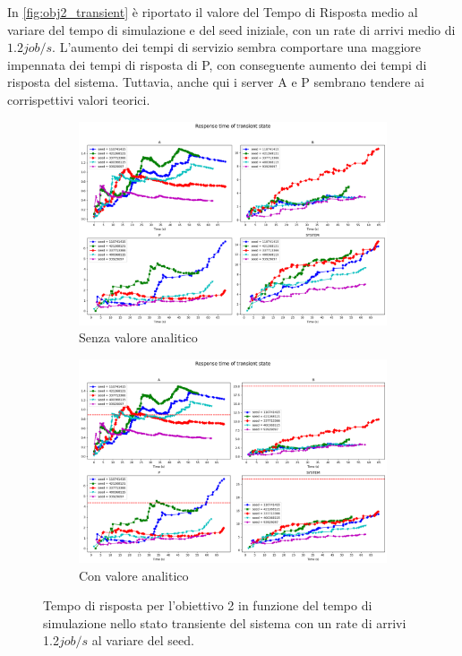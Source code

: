In \autoref{fig:obj2_transient} è riportato il valore del Tempo di Risposta medio al variare del tempo di simulazione e del seed iniziale, con un rate di arrivi medio di $1.2 job/s$. L'aumento dei tempi di servizio sembra comportare una maggiore impennata dei tempi di risposta di P, con conseguente aumento dei tempi di risposta del sistema. Tuttavia, anche qui i server A e P sembrano tendere ai corrispettivi valori teorici.

\begin{figure}
    \centering
    \begin{subfigure}{\linewidth}
        \centering
        \includegraphics[width=0.8\linewidth]{figs/appendices/transient/obj2-transient-rtime.png}
        \caption{Senza valore analitico}
        \label{fig:obj2_transient_simulation}
        \end{subfigure} 
    \begin{subfigure}{\linewidth}
        \centering
        \includegraphics[width=0.8\linewidth]{figs/appendices/transient/obj2-transient-rtime-analitycal.png}
        \caption{Con valore analitico}
        \label{fig:obj2_transient_analitycal}
        \end{subfigure}
    \caption{Tempo di risposta per l'obiettivo 2 in funzione del tempo di simulazione nello stato transiente del sistema con un rate di arrivi 1.2$job/s$ al variare del seed.}
    \label{fig:obj2_transient}
\end{figure}

